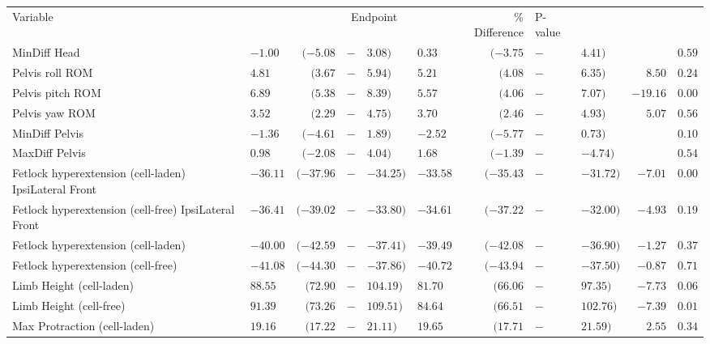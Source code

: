 \documentclass[twocolumn, empirical, authordate, issue]{jote-new-article}
\begin{document}
\begin{table}[ht!] 
\begin{tabularx}{\linewidth}{>{\raggedright}p{}>{\raggedleft\arraybackslash}Xrp{}l>{\raggedleft\arraybackslash}Xrp{}lrr}   \multicolumn{11}{c}{\cellcolor[HTML]{ffffff}}\\[-2ex]
\toprule Variable & \multicolumn{4}{c}{Baseline} & \multicolumn{4}{c}{Endpoint}  & \% Difference & P-value\tabularnewline \midrule  
MinDiff Head & $  -1.00$ & $ (-5.08$ & $-$ & $3.08)  $& $  0.33$ & $ (-3.75$ & $-$ & $4.41)  $& & $  0.59  $\tabularnewline Pelvis roll ROM & $ 4.81$ & $ (3.67$ & $-$ & $5.94)  $& $ 5.21$ & $ (4.08$ & $-$ & $6.35)  $&$  8.50 $& $  0.24  $ \tabularnewline
Pelvis pitch ROM &  $\mathbf{ 6.89}$ & $\mathbf{ (5.38}$ & $\mathbf{-}$ & $\mathbf{8.39)  }$& $\mathbf{ 5.57}$ & $\mathbf{ (4.06}$ & $\mathbf{-}$ & $\mathbf{7.07)  }$& $\mathbf{  -19.16 }$ & $\mathbf{  0.00  }$ \tabularnewline 
Pelvis yaw ROM & $ 3.52$ & $ (2.29$ & $-$ & $4.75)  $& $ 3.70$ & $ (2.46$ & $-$ & $4.93)  $& $  5.07 $& $  0.56  $\tabularnewline 
MinDiff Pelvis & $  -1.36$ & $ (-4.61$ & $-$ & $1.89)  $& $  -2.52$ & $ (-5.77$ & $-$ & $0.73)  $& &$  0.10  $\tabularnewline MaxDiff Pelvis & $ 0.98$ & $ (-2.08$ & $-$ & $4.04)  $& $ 1.68$ & $ (-1.39$ & $-$ & $-4.74)  $& &$  0.54  $\tabularnewline
Fetlock hyperextension (cell-laden)  IpsiLateral Front & $  -36.11$ & $ (-37.96$ & $-$ & $-34.25)  $& $  -33.58$ & $ (-35.43$ & $-$ & $-31.72)  $& $  -7.01 $& $  0.00  $\tabularnewline
Fetlock hyperextension (cell-free) IpsiLateral Front & $\mathbf{  -36.41}$ & $\mathbf{ (-39.02}$ & $\mathbf{-}$ & $\mathbf{-33.80)  }$& $\mathbf{  -34.61}$ & $\mathbf{ (-37.22}$ & $\mathbf{-}$ & $\mathbf{-32.00)  }$& $\mathbf{  -4.93 }$& $\mathbf{  0.19  }$\tabularnewline
Fetlock hyperextension (cell-laden) & $  -40.00$ & $ (-42.59$ & $-$ & $-37.41)  $& $  -39.49$ & $ (-42.08$ & $-$ & $-36.90) $& $  -1.27 $ & $  0.37  $\tabularnewline
Fetlock hyperextension (cell-free) & $  -41.08$ & $ (-44.30$ & $-$ & $-37.86)  $& $  -40.72$ & $ (-43.94$ & $-$ & $-37.50)  $& $  -0.87 $& $  0.71  $\tabularnewline
Limb Height (cell-laden) & $ 88.55$ & $ (72.90$ & $-$ & $104.19)  $& $ 81.70$ & $ (66.06$ & $-$ & $97.35)  $& $  -7.73 $& $  0.06  $\tabularnewline
Limb Height (cell-free) & $\mathbf{ 91.39}$ & $\mathbf{ (73.26}$ & $\mathbf{-}$ & $\mathbf{109.51)  }$& $\mathbf{ 84.64}$ & $\mathbf{ (66.51}$ & $\mathbf{-}$ & $\mathbf{102.76)  }$& $\mathbf{  -7.39 }$& $\mathbf{  0.01  }$\tabularnewline
Max Protraction (cell-laden) & $ 19.16$ & $ (17.22$ & $-$ & $21.11)  $& $ 19.65$ & $ (17.71$ & $-$ & $21.59)  $& $  2.55 $& $  0.34  $\tabularnewline 

\end{tabularx}
\end{table}
\end{document}
